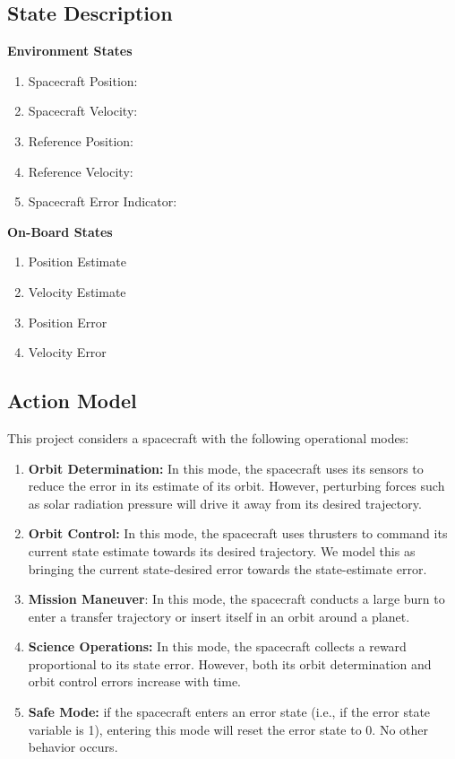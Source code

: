 \documentclass[]{article}
\begin{document}
\subsection{State Description}
\textbf{Environment States}

\begin{enumerate}
	\item Spacecraft Position:
	\item Spacecraft Velocity:
	\item Reference Position:
	\item Reference Velocity:
	\item Spacecraft Error Indicator:
\end{enumerate}

\textbf{On-Board States}
\begin{enumerate}
	\item Position Estimate
	\item Velocity Estimate
	\item Position Error
	\item Velocity Error
\end{enumerate}

\subsection{Action Model}
This project considers a spacecraft with the following operational modes:
\begin{enumerate}
	\item \textbf{Orbit Determination:} In this mode, the spacecraft uses its sensors to reduce the error in its estimate of its orbit. However, perturbing forces such as solar radiation pressure will drive it away from its desired trajectory.
	
	\item \textbf{Orbit Control:} In this mode, the spacecraft uses thrusters to command its current state estimate towards its desired trajectory. We model this as bringing the current state-desired error towards the state-estimate error. 
	
	\item \textbf{Mission Maneuver}: In this mode, the spacecraft conducts a large burn to enter a transfer trajectory or insert itself in an orbit around a planet. 
	
	\item \textbf{Science Operations:} In this mode, the spacecraft collects a reward proportional to its state error. However, both its orbit determination and orbit control errors increase with time.
	
	\item \textbf{Safe Mode:} if the spacecraft enters an error state (i.e., if the error state variable is 1), entering this mode will reset the error state to 0. No other behavior occurs. 
\end{enumerate}
\end{document}
